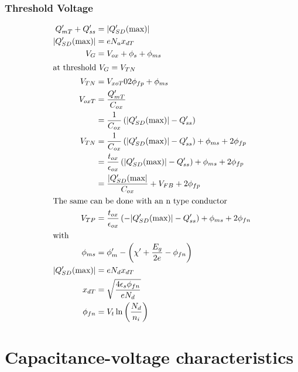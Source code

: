 \documentclass[article,oneside]{memoir}
\begin{document}
\subsection{Threshold Voltage}
\begin{align*}
        Q_{mT}'+Q_{ss}'&=\lvert Q_{SD}'(\textup{max})\rvert\\
        \lvert Q_{SD}'(\textup{max})\rvert&=eN_ax_{dT}\\
        V_{G}&=V_{ox}+\phi_{s}+\phi_{ms}\\
        \intertext{at threshold $V_G=V_{TN}$}
        V_{TN}&=V_{xoT}02\phi_{fp}+\phi_{ms}\\
        V_{oxT}&=\frac{Q_{mT}'}{C_{ox}}\\
        &=\frac{1}{C_{ox}}\left( \lvert Q_{SD}'(\textup{max})\rvert -Q_{ss}' \right)\\
        V_{TN}&=\frac{1}{C_{ox}}\left( \lvert Q_{SD}'(\textup{max})\rvert -Q_{ss}'\right)+\phi_{ms}+2\phi_{fp}\\
        &=\frac{t_{ox}}{\epsilon_{ox}}\left( \lvert Q_{SD}'(\textup{max})\rvert -Q_{ss}'\right)+\phi_{ms}+2\phi_{fp}\\
        &=\frac{\lvert Q_{SD}'(\textup{max}\rvert}{C_{ox}}+V_{FB}+2\phi_{fp}\\
        \intertext{The same can be done with an n type conductor}
        V_{TP}&=\frac{t_{ox}}{\epsilon_{ox}}\left( -\lvert Q_{SD}'(\textup{max})\rvert -Q_{ss}'\right)+\phi_{ms}+2\phi_{fn}\\
        \intertext{with}
        \phi_{ms}&=\phi_{m}'-\left( \chi'+\frac{E_g}{2e}-\phi_{fn} \right)\\
        \lvert Q_{SD}'(\textup{max})\rvert&=eN_d x_{dT}\\
        x_{dT}&=\sqrt{\frac{4\epsilon_s\phi_{fn}}{eN_d}}\\
        \phi_{fn}&=V_t\ln\left( \frac{N_d}{n_i} \right)
\end{align*}
\chapter{Capacitance-voltage characteristics}

\end{document}
